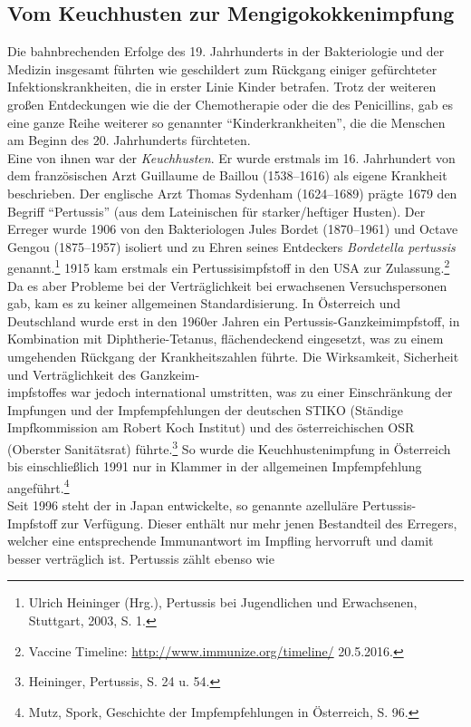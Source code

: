 \documentclass[
    a4paper,
    12pt,
    hyphens,
    chapterprefix=true,
    headheight=33pt,
    footheight=29pt,
    headings=optiontohead, %
]{scrartcl}
\begin{document}
\subsection{Vom Keuchhusten zur Mengigokokkenimpfung}
Die bahnbrechenden Erfolge des 19. Jahrhunderts in der Bakteriologie und der Medizin insgesamt führten wie geschildert zum Rückgang einiger gefürchteter Infektionskrankheiten, die in erster Linie Kinder betrafen. Trotz der weiteren großen Entdeckungen wie die der Chemotherapie oder die des Penicillins, gab es eine ganze Reihe weiterer so genannter "`Kinderkrankheiten"', die die Menschen am Beginn des 20. Jahrhunderts fürchteten.\\
Eine von ihnen war der \textit{Keuchhusten}. Er wurde erstmals im 16. Jahrhundert von dem französischen Arzt Guillaume de Baillou (1538--1616) als eigene Krankheit beschrieben. Der englische Arzt Thomas Sydenham (1624--1689) prägte 1679 den Begriff "`Pertussis"' (aus dem Lateinischen für starker/heftiger Husten). Der Erreger wurde 1906 von den Bakteriologen Jules Bordet (1870--1961) und Octave Gengou (1875--1957) isoliert und zu Ehren seines Entdeckers \textit{Bordetella pertussis} genannt.\footnote{Ulrich Heininger (Hrg.), Pertussis bei Jugendlichen und Erwachsenen, Stuttgart, 2003, S. 1.} 1915 kam erstmals ein Pertussisimpfstoff in den USA zur Zulassung.\footnote{Vaccine Timeline: \url{http://www.immunize.org/timeline/} 20.5.2016.} Da es aber Probleme bei der Verträglichkeit bei erwachsenen Versuchspersonen gab, kam es zu keiner allgemeinen Standardisierung. In Österreich und Deutschland wurde erst in den 1960er Jahren ein Pertussis-Ganzkeimimpfstoff, in Kombination mit Diphtherie-Tetanus, flächendeckend eingesetzt, was zu einem umgehenden Rückgang der Krankheitszahlen führte. Die Wirksamkeit, Sicherheit und Verträglichkeit des Ganzkeim-\\impfstoffes war jedoch international umstritten, was zu einer Einschränkung der Impfungen und der Impfempfehlungen der deutschen STIKO (Ständige Impfkommission am Robert Koch Institut) und des österreichischen OSR (Oberster Sanitätsrat) führte.\footnote{Heininger, Pertussis, S. 24 u. 54.} So wurde die Keuchhustenimpfung in Österreich bis einschließlich 1991 nur in Klammer in der allgemeinen Impfempfehlung angeführt.\footnote{Mutz, Spork, Geschichte der Impfempfehlungen in Österreich, S. 96.} \\
Seit 1996 steht der in Japan entwickelte, so genannte azelluläre Pertussis-Impfstoff zur Verfügung. Dieser enthält nur mehr jenen Bestandteil
des Erregers, welcher eine entsprechende Immunantwort im Impfling hervorruft und damit besser verträglich ist. Pertussis zählt ebenso wie
\end{document}
